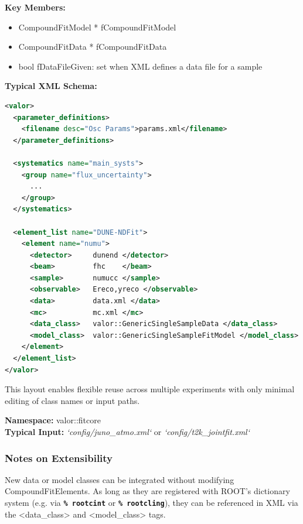 \vspace{0.5em}
\noindent\textbf{Key Members:}

\begin{itemize}
  \item {\color{amber}CompoundFitModel * fCompoundFitModel}
  \item {\color{amber}CompoundFitData * fCompoundFitData}
  \item {\color{amber}bool fDataFileGiven}: set when XML defines a data file for a sample
\end{itemize}

\vspace{0.5em}
\noindent\textbf{Typical XML Schema:}

\begin{lstlisting}[language=xml]
<valor>
  <parameter_definitions>
    <filename desc="Osc Params">params.xml</filename>
  </parameter_definitions>

  <systematics name="main_systs">
    <group name="flux_uncertainty">
      ...
    </group>
  </systematics>

  <element_list name="DUNE-NDFit">
    <element name="numu">
      <detector>     dunend </detector>
      <beam>         fhc    </beam>
      <sample>       numucc </sample>
      <observable>   Ereco,yreco </observable>
      <data>         data.xml </data>
      <mc>           mc.xml </mc>
      <data_class>   valor::GenericSingleSampleData </data_class>
      <model_class>  valor::GenericSingleSampleFitModel </model_class>
    </element>
  </element_list>
</valor>
\end{lstlisting}

\vspace{0.5em}
This layout enables flexible reuse across multiple experiments with only minimal editing of class names or input paths.

\vspace{1em}
\noindent\textbf{Namespace:} {\color{amber}valor::fitcore} \\
\noindent\textbf{Typical Input:} {\it`config/juno\_atmo.xml`} or {\it`config/t2k\_jointfit.xml`}

\vspace{1em}
\subsubsection*{Notes on Extensibility}

New data or model classes can be integrated without modifying {\color{cadmiumgreen} CompoundFitElements}.  
As long as they are registered with ROOT’s dictionary system (e.g. via {\bf \tt \% rootcint} or {\bf \tt \% rootcling}), they can be referenced in XML via the {\color{amber}<data\_class>} and {\color{amber}<model\_class>} tags.

